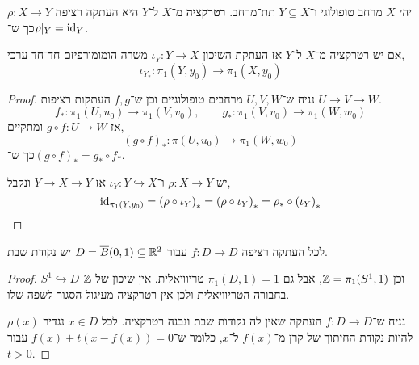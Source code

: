 \begin{definition}[רטרקציה]
	יהי $X$ מרחב טופולוגי ו־$Y \subseteq X$ תת־מרחב.
	\textbf{רטרקציה} מ־$X$ ל־$Y$ היא העתקה רציפה $\rho : X \to Y$ כך ש־$\rho |_Y = \operatorname{id}_Y$.
\end{definition}
\begin{proposition}
	אם יש רטרקציה מ־$X$ ל־$Y$ אז העתקת השיכון $\iota_Y : Y \to X$ משרה הומומורפיזם חד־חד ערכי,
	\[
		\iota_{Y_*} : \pi_1(Y, y_0) \to \pi_1(X, y_0)
	\]
\end{proposition}
\begin{proof}
	נניח ש־$U, V, W$ מרחבים טופולוגיים וכן ש־$f, g$ העתקות רציפות $U \to V \to W$.
	\[
		f_* : \pi_1(U, u_0) \to \pi_1(V, v_0),
		\qquad
		g_* : \pi_1(V, v_0) \to \pi_1(W, w_0)
	\]
	אז $g \circ f : U \to W$ ומתקיים,
	\[
		{(g \circ f)}_* : \pi(U, u_0) \to \pi_1(W, w_0)
	\]
	כך ש־${(g \circ f)}_* = g_* \circ f_*$.

	יש $\rho : X \to Y$ ו־$\iota_Y : Y \hookrightarrow X$ אז $Y \to X \to Y$ ונקבל,
	\[
		\operatorname{id}_{\pi_1(Y, y_0)}
		= {(\rho \circ \iota_Y)}_*
		= {(\rho \circ \iota_Y)}_*
		= \rho_* \circ {(\iota_Y)}_*
	\]
\end{proof}
\begin{conclusion}
	לכל העתקה רציפה $f : D \to D$ עבור $D = \overline{B}(0, 1) \subseteq \mathbb{R}^2$ יש נקודת שבת.
\end{conclusion}
\begin{proof}
	$S^1 \hookrightarrow D$ וכן $\mathbb{Z} = \pi_1(S^1, 1)$, אבל גם $\pi_1(D, 1) = 1$ טריוויאלית.
	אין שיכון של $\mathbb{Z}$ בחבורה הטריוויאלית ולכן אין רטרקציה מעיגול הסגור לשפה שלו.

	נניח ש־$f : D \to D$ העתקה שאין לה נקודות שבת ונבנה רטרקציה.
	לכל $x \in D$ נגדיר $\rho(x)$ להיות נקודת החיתוך של קרן מ־$f(x)$ ל־$x$, כלומר ש־$f(x) + t(x - f(x)) = 0$ עבור $t > 0$.
\end{proof}

